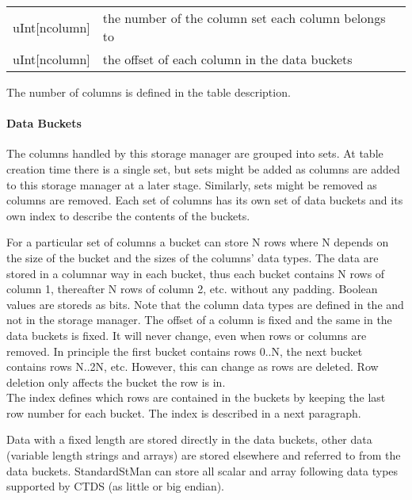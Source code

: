 \vspace{0.15in}
\begin{tabular}{|l|p{13cm}|} \hline
  uInt[ncolumn] & the number of the column set each column belongs to \\
  uInt[ncolumn] & the offset of each column in the data buckets \\
  \hline
\end{tabular}
\vspace{0.15in}
The number of columns is defined in the table description.

\paragraph{Data Buckets\\}
The columns handled by this storage manager are grouped into sets. At
table creation time there is a single set, but sets might be added as
columns are added to this storage manager at a later stage. Similarly,
sets might be removed as columns are removed.
Each set of columns has its own set of data buckets and its own index
to describe the contents of the buckets.

For a particular set of columns a bucket can store N rows where N
depends on the size of the bucket and the sizes of the columns' data
types.
The data are stored in a columnar way in each bucket, thus each
bucket contains N rows of column 1, thereafter N rows of column 2,
etc. without any padding. Boolean values are storeds as bits. Note
that the column data types are defined in the
 and not in the storage manager.
The offset of a column is fixed and the same in the data buckets is
fixed. It will never change, even when rows or columns are removed.
In principle the first bucket contains rows 0..N, the next bucket contains rows
N..2N, etc. However, this can change as rows are deleted. Row deletion
only affects the bucket the row is in.
\\The index defines which rows are contained in the buckets by keeping the
last row number for each bucket. The index is described
in a next paragraph.

Data with a fixed length are stored directly in the data buckets, other
data (variable length strings and arrays) are stored elsewhere and referred to from the data buckets.
StandardStMan can store all scalar and array  following data types
supported by CTDS (as little or big endian).

